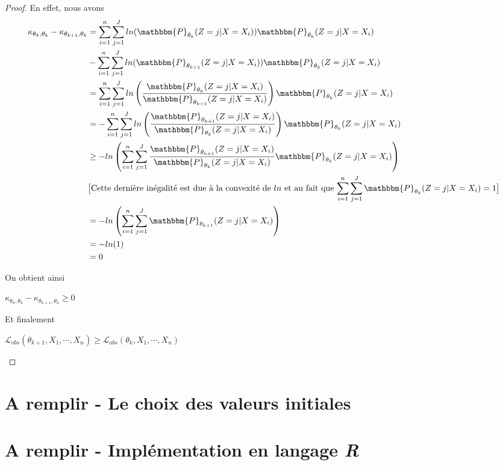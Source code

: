 \documentclass[frenchb]{report}
\newcommand{\1}{\mathbbm{1}}
\newcommand{\prob}{\mathbbm{P}}
\newcommand{\lv}{\mathcal{L}}
\theoremstyle{definition}\newtheorem{defn}{Définition}
\theoremstyle{definition}\newtheorem{exm}{Exemple}
\theoremstyle{definition}\newtheorem{nota}{Notation}
\theoremstyle{definition}\newtheorem{rem}{Remarque}
\begin{document}
\begin{proof}
En effet, nous avons
\begin{align*}
\kappa_{\theta_{k}, \theta_k}-\kappa_{\theta_{k+1}, \theta_k} &= \sum_{i=1}^n\sum_{j=1}^J ln(\prob_{\theta_k}(Z = j|X=X_i))\prob_{\theta_k}(Z = j|X = X_i) \\
&- \sum_{i=1}^n \sum_{j=1}^J ln(\prob_{\theta_{k+1}}(Z = j|X=X_i))\prob_{\theta_k}(Z = j|X = X_i) \\
&= \sum_{i=1}^n \sum_{j=1}^J ln\left(\frac{\prob_{\theta_k}(Z = j|X=X_i)}{\prob_{\theta_{k+1}}(Z = j|X=X_i)}\right)\prob_{\theta_k}(Z = j|X = X_i)\\
&= - \sum_{i=1}^n \sum_{j=1}^J ln\left(\frac{\prob_{\theta_{k+1}}(Z = j|X=X_i)}{\prob_{\theta_k}(Z = j|X=X_i)}\right)\prob_{\theta_k}(Z = j|X = X_i)\\
&\geq - ln\left( \sum_{i=1}^n\sum_{j=1}^J \frac{\prob_{\theta_{k+1}}(Z = j|X=X_i)}{\prob_{\theta_k}(Z = j|X=X_i)}\prob_{\theta_k}(Z = j|X = X_i) \right)\\
&\text{$\big[$Cette dernière inégalité est due à la convexité de $ln$ et au fait que $\displaystyle\sum_{i=1}^n\sum_{j=1}^J\prob_{\theta_k}(Z = j|X=X_i)=1\big]$}\\
&= - ln\left( \sum_{i=1}^n\sum_{j=1}^J\prob_{\theta_{k+1}}(Z = j|X=X_i)\right)\\
&=  -l n(1)\\
&= 0
\end{align*}


On obtient ainsi

\begin{center} $\kappa_{\theta_{k}, \theta_k}-\kappa_{\theta_{k+1}, \theta_k} \geq 0$ \end{center}


Et finalement
\begin{center} $\lv_{obs}(\theta_{k+1}, X_1, \cdots, X_n) \geq \lv_{obs}(\theta_k, X_1, \cdots, X_n)$ \end{center}

\end{proof}

\newpage

\section{A remplir - Le choix des valeurs initiales}

\section{A remplir - Implémentation en langage \textit{R}}
\end{document}
